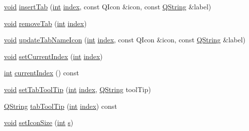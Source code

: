 \begin{DoxyCompactItemize}
\hyperlink{group___u_a_v_objects_plugin_ga444cf2ff3f0ecbe028adce838d373f5c}{void} \hyperlink{group___core_plugin_gaca91c882df5cac0ebb8cc47ed7dab0f8}{insert\-Tab} (\hyperlink{ioapi_8h_a787fa3cf048117ba7123753c1e74fcd6}{int} \hyperlink{glext_8h_ab47dd9958bcadea08866b42bf358e95e}{index}, const Q\-Icon \&icon, const \hyperlink{group___u_a_v_objects_plugin_gab9d252f49c333c94a72f97ce3105a32d}{Q\-String} \&label)
\item 
\hyperlink{group___u_a_v_objects_plugin_ga444cf2ff3f0ecbe028adce838d373f5c}{void} \hyperlink{group___core_plugin_gaf4a1b5707a90c73e3bdb7dbbaf77d86a}{remove\-Tab} (\hyperlink{ioapi_8h_a787fa3cf048117ba7123753c1e74fcd6}{int} \hyperlink{glext_8h_ab47dd9958bcadea08866b42bf358e95e}{index})
\item 
\hyperlink{group___u_a_v_objects_plugin_ga444cf2ff3f0ecbe028adce838d373f5c}{void} \hyperlink{group___core_plugin_ga2395ca4b2340f7f5e54d4fada4e0e929}{update\-Tab\-Name\-Icon} (\hyperlink{ioapi_8h_a787fa3cf048117ba7123753c1e74fcd6}{int} \hyperlink{glext_8h_ab47dd9958bcadea08866b42bf358e95e}{index}, const Q\-Icon \&icon, const \hyperlink{group___u_a_v_objects_plugin_gab9d252f49c333c94a72f97ce3105a32d}{Q\-String} \&label)
\item 
\hyperlink{group___u_a_v_objects_plugin_ga444cf2ff3f0ecbe028adce838d373f5c}{void} \hyperlink{group___core_plugin_gabf70f3132174e9d8c21315e2684150de}{set\-Current\-Index} (\hyperlink{ioapi_8h_a787fa3cf048117ba7123753c1e74fcd6}{int} \hyperlink{glext_8h_ab47dd9958bcadea08866b42bf358e95e}{index})
\item 
\hyperlink{ioapi_8h_a787fa3cf048117ba7123753c1e74fcd6}{int} \hyperlink{group___core_plugin_ga4616dd0bc8b0ff81cd79c83c9a713e3e}{current\-Index} () const 
\item 
\hyperlink{group___u_a_v_objects_plugin_ga444cf2ff3f0ecbe028adce838d373f5c}{void} \hyperlink{group___core_plugin_gacdb64539fcc17c999349bfc1af98f66a}{set\-Tab\-Tool\-Tip} (\hyperlink{ioapi_8h_a787fa3cf048117ba7123753c1e74fcd6}{int} \hyperlink{glext_8h_ab47dd9958bcadea08866b42bf358e95e}{index}, \hyperlink{group___u_a_v_objects_plugin_gab9d252f49c333c94a72f97ce3105a32d}{Q\-String} tool\-Tip)
\item 
\hyperlink{group___u_a_v_objects_plugin_gab9d252f49c333c94a72f97ce3105a32d}{Q\-String} \hyperlink{group___core_plugin_ga3f18cabada7a29855070e6a49d684997}{tab\-Tool\-Tip} (\hyperlink{ioapi_8h_a787fa3cf048117ba7123753c1e74fcd6}{int} \hyperlink{glext_8h_ab47dd9958bcadea08866b42bf358e95e}{index}) const 
\item 
\hyperlink{group___u_a_v_objects_plugin_ga444cf2ff3f0ecbe028adce838d373f5c}{void} \hyperlink{group___core_plugin_gafe9a2d6fdb7ecd3eb6be77cbfbcec6ce}{set\-Icon\-Size} (\hyperlink{ioapi_8h_a787fa3cf048117ba7123753c1e74fcd6}{int} \hyperlink{glext_8h_ad585a1393cfa368fa9dc3d8ebff640d5}{s})

\end{DoxyCompactItemize}
